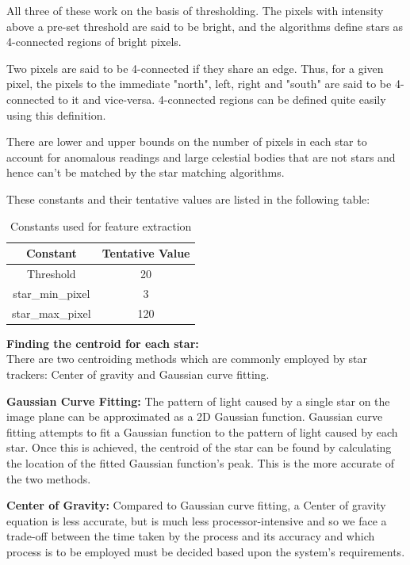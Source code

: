 \documentclass[../../main.tex]{subfiles}
\begin{document}
All three of these work on the basis of thresholding. The pixels with intensity above a pre-set threshold are said to be bright, and the algorithms define stars as 4-connected regions of bright pixels. 

Two pixels are said to be 4-connected if they share an edge. Thus, for a given pixel, the pixels to the immediate "north", left, right and "south" are said to be 4-connected to it and vice-versa. 4-connected regions can be defined quite easily using this definition.

There are lower and upper bounds on the number of pixels in each star to account for anomalous readings and large celestial bodies that are not stars and hence can't be matched by the star matching algorithms.

These constants and their tentative values are listed in the following table:

\begin{table}[h]
    \centering
    \begin{tabular}{|c|c|}
        \hline
        \textbf{Constant} & \textbf{Tentative Value}\\
        \hline
        Threshold & 20\\
        star\_min\_pixel & 3 \\
        star\_max\_pixel & 120\\
        \hline
    \end{tabular}
    \caption{Constants used for feature extraction}
    \label{tab:fe_const}
\end{table}

\large{\textbf{Finding the centroid for each star:}}\\
\normalsize
There are two centroiding methods which are commonly employed by star trackers:
Center of gravity and Gaussian curve fitting.

\textbf{Gaussian Curve Fitting:}
The pattern of light caused by a single star on the image plane can be approximated as a 2D Gaussian function. Gaussian curve fitting attempts to fit a Gaussian function to the pattern of light caused by each star. Once this is achieved, the centroid of the star can be found by calculating the location of the fitted Gaussian function's peak. This is the more accurate of the two methods.

\textbf{Center of Gravity:}
Compared to Gaussian curve fitting, a Center of gravity equation is less accurate, but is much less processor-intensive and so we face a trade-off between the time taken by the process and its accuracy and which process is to be employed must be decided based upon the system's requirements.
\end{document}
